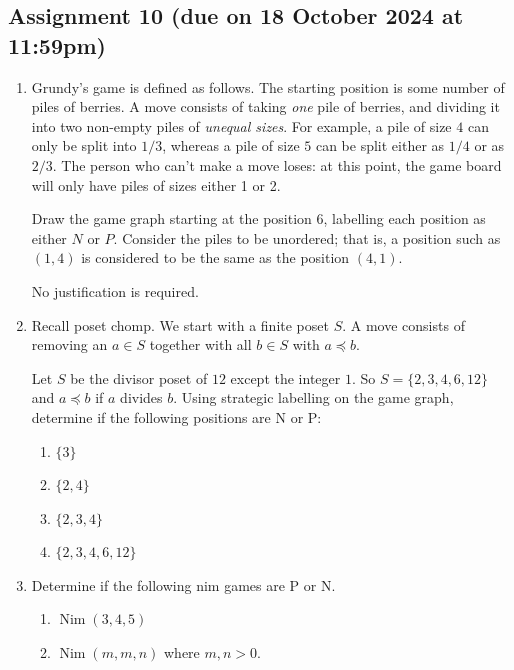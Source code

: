 \documentclass{amsart}
\begin{document}
\subsection{Assignment 10  (due on 18 October 2024 at 11:59pm)}
\label{sec:org24ca349}
\toggletrue{solutions}

\begin{enumerate}
\item Grundy's game is defined as follows.
The starting position is some number of piles of berries.
A move consists of taking \emph{one} pile of berries, and dividing it into two non-empty piles of \emph{unequal sizes}.
For example, a pile of size \(4\) can only be split into \(1/3\), whereas a pile of size \(5\) can be split either as \(1/4\) or as \(2/3\).
The person who can't make a move loses: at this point, the game board will only have piles of sizes either 1 or 2.

Draw the game graph starting at the position \(6\), labelling each position as either \(N\) or \(P\).
Consider the piles to be unordered; that is, a position such as \((1,4)\) is considered to be the same as the position \((4,1)\).

No justification is required.

\item Recall poset chomp.
We start with a finite poset \(S\).
A move consists of removing an \(a \in S\) together with all \(b \in S\) with \(a \preceq b\).

Let \(S\) be the divisor poset of \(12\) except the integer \(1\).
So \(S = \{2,3,4,6,12\}\) and \(a \preceq b\) if \(a\) divides \(b\).
Using strategic labelling on the game graph, determine if the following positions are N or P:

\begin{enumerate}
\item \(\{3\}\)

\item \(\{2,4\}\)

\item \(\{2,3,4\}\)

\item \(\{2,3,4,6,12\}\)
\end{enumerate}

\item Determine if the following nim games are P or N.
\begin{enumerate}
\item \(\operatorname{Nim}(3,4,5)\)

\item \(\operatorname{Nim}(m,m,n)\) where \(m, n > 0\).


\end{enumerate}
\end{enumerate}
\end{document}
